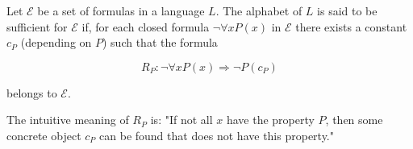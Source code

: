 Let $\mathcal{E}$ be a set of formulas in a language $L$. The alphabet of $L$ is said to be sufficient for $\mathcal{E}$ if, for each closed formula $\neg \forall x P(x)$ in $\mathcal{E}$ there exists a constant $c_P$ (depending on $P$) such that the formula

$$R_P: \neg \forall x P(x) \Rightarrow \neg P(c_P)$$

belongs to $\mathcal{E}$.

The intuitive meaning of $R_P$ is: "If not all $x$ have the property $P$, then some concrete object $c_P$ can be found that does not have this property."
